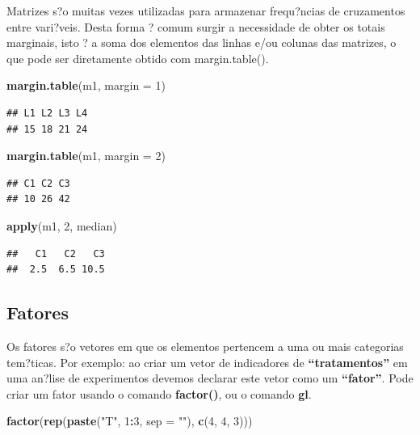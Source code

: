 \documentclass[]{book}
\newenvironment{Shaded}{\begin{snugshade}}{\end{snugshade}}
\newcommand{\DataTypeTok}[1]{\textcolor[rgb]{0.13,0.29,0.53}{#1}}
\newcommand{\DecValTok}[1]{\textcolor[rgb]{0.00,0.00,0.81}{#1}}
\newcommand{\KeywordTok}[1]{\textcolor[rgb]{0.13,0.29,0.53}{\textbf{#1}}}
\newcommand{\NormalTok}[1]{#1}
\newcommand{\OperatorTok}[1]{\textcolor[rgb]{0.81,0.36,0.00}{\textbf{#1}}}
\newcommand{\StringTok}[1]{\textcolor[rgb]{0.31,0.60,0.02}{#1}}
\begin{document}
Matrizes s?o muitas vezes utilizadas para armazenar frequ?ncias de cruzamentos entre vari?veis. Desta forma ? comum surgir a necessidade de obter os totais marginais, isto ? a soma dos elementos das linhas e/ou colunas das matrizes, o que pode ser diretamente obtido com margin.table().

\begin{Shaded}
\begin{Highlighting}[]
 \KeywordTok{margin.table}\NormalTok{(m1, }\DataTypeTok{margin =} \DecValTok{1}\NormalTok{)}
\end{Highlighting}
\end{Shaded}

\begin{verbatim}
## L1 L2 L3 L4 
## 15 18 21 24
\end{verbatim}

\begin{Shaded}
\begin{Highlighting}[]
 \KeywordTok{margin.table}\NormalTok{(m1, }\DataTypeTok{margin =} \DecValTok{2}\NormalTok{)}
\end{Highlighting}
\end{Shaded}

\begin{verbatim}
## C1 C2 C3 
## 10 26 42
\end{verbatim}

\begin{Shaded}
\begin{Highlighting}[]
 \KeywordTok{apply}\NormalTok{(m1, }\DecValTok{2}\NormalTok{, median)}
\end{Highlighting}
\end{Shaded}

\begin{verbatim}
##   C1   C2   C3 
##  2.5  6.5 10.5
\end{verbatim}

\hypertarget{fatores}{%
\subsection{Fatores}\label{fatores}}

Os fatores s?o vetores em que os elementos pertencem a uma ou mais categorias tem?ticas. Por exemplo: ao criar um vetor de indicadores de \textbf{``tratamentos''} em uma an?lise de experimentos devemos declarar este vetor como um \textbf{``fator''}.
Pode criar um fator usando o comando \textbf{factor()}, ou o comando \textbf{gl}.

\begin{Shaded}
\begin{Highlighting}[]
\KeywordTok{factor}\NormalTok{(}\KeywordTok{rep}\NormalTok{(}\KeywordTok{paste}\NormalTok{(}\StringTok{"T"}\NormalTok{, }\DecValTok{1}\OperatorTok{:}\DecValTok{3}\NormalTok{, }\DataTypeTok{sep =} \StringTok{""}\NormalTok{), }\KeywordTok{c}\NormalTok{(}\DecValTok{4}\NormalTok{, }\DecValTok{4}\NormalTok{, }\DecValTok{3}\NormalTok{)))}
\end{Highlighting}
\end{Shaded}
\end{document}
